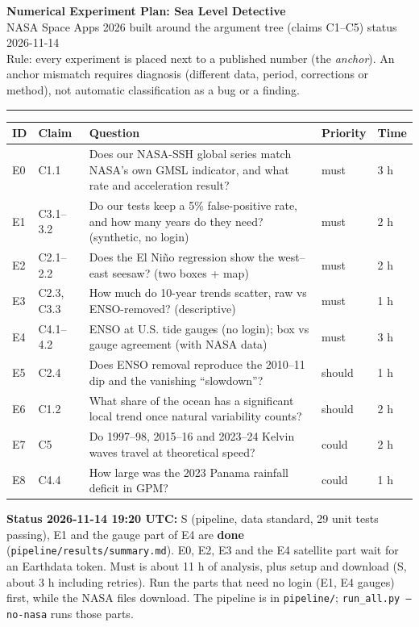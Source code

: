 \documentclass[10pt]{article}
\begin{document}
\begin{center}
{\sffamily\LARGE\bfseries Numerical Experiment Plan: Sea Level Detective}\\[4pt]
{\small NASA Space Apps 2026 \textperiodcentered{} built around the argument tree (claims C1--C5) \textperiodcentered{} status 2026-11-14}\\[2pt]
{\footnotesize Rule: every experiment is placed next to a published number (the \emph{anchor}). An anchor mismatch requires diagnosis
(different data, period, corrections or method), not automatic classification as a bug or a finding.}
\end{center}
\vspace{-4pt}\noindent\rule{\linewidth}{0.8pt}

\begin{tcolorbox}[enhanced,sharp corners,boxrule=0.6pt,colframe=black,colback=black!5,colbacktitle=black,coltitle=white,
  title={OVERVIEW},fonttitle=\sffamily\bfseries\footnotesize,fontupper=\small,left=5pt,right=5pt,toptitle=1pt,bottomtitle=1pt]
\begin{tabularx}{\linewidth}{@{}l l Y l l@{}}
\toprule
ID & Claim & Question & Priority & Time\\\midrule
E0 & C1.1 & Does our NASA-SSH global series match NASA's own GMSL indicator, and what rate and acceleration result? & must & 3 h\\
E1 & C3.1--3.2 & Do our tests keep a 5\% false-positive rate, and how many years do they need? (synthetic, no login) & must & 2 h\\
E2 & C2.1--2.2 & Does the El Ni\~no regression show the west--east seesaw? (two boxes + map) & must & 2 h\\
E3 & C2.3, C3.3 & How much do 10-year trends scatter, raw vs ENSO-removed? (descriptive) & must & 1 h\\
E4 & C4.1--4.2 & ENSO at U.S. tide gauges (no login); box vs gauge agreement (with NASA data) & must & 3 h\\
E5 & C2.4 & Does ENSO removal reproduce the 2010--11 dip and the vanishing ``slowdown''? & should & 1 h\\
E6 & C1.2 & What share of the ocean has a significant local trend once natural variability counts? & should & 2 h\\
E7 & C5 & Do 1997--98, 2015--16 and 2023--24 Kelvin waves travel at theoretical speed? & could & 2 h\\
E8 & C4.4 & How large was the 2023 Panama rainfall deficit in GPM? & could & 1 h\\\bottomrule
\end{tabularx}
\textbf{Status 2026-11-14 19:20 UTC:} S (pipeline, data standard, 29 unit tests passing), E1 and the gauge part of E4 are \textbf{done}
(\texttt{pipeline/results/summary.md}). E0, E2, E3 and the E4 satellite part wait for an Earthdata token.
Must is about 11 h of analysis, plus setup and download (S, about 3 h including retries). Run the parts that need no login (E1, E4 gauges)
first, while the NASA files download. The pipeline is in \texttt{pipeline/}; \texttt{run\_all.py --no-nasa} runs those parts.
\end{tcolorbox}
\end{document}
